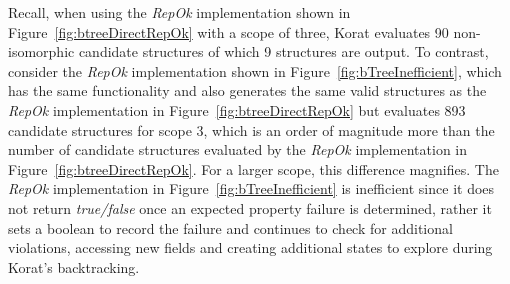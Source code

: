 \para 
Recall, when using the \emph{RepOk} implementation shown in
Figure~\ref{fig:btreeDirectRepOk} with a scope of three, Korat
evaluates 90 non-isomorphic candidate structures of which 9 structures
are output. To contrast, consider the \emph{RepOk} implementation
shown in Figure~\ref{fig:bTreeInefficient}, which has the same
functionality and also generates the same valid structures as the
\emph{RepOk} implementation in Figure~\ref{fig:btreeDirectRepOk} but
evaluates 893 candidate structures for scope 3, which is an order of
magnitude more than the number of candidate structures evaluated by
the \emph{RepOk} implementation in
Figure~\ref{fig:btreeDirectRepOk}. For a larger scope, this difference
magnifies.  The \emph{RepOk} implementation in
Figure~\ref{fig:bTreeInefficient} is inefficient since it does not
return \emph{true/false} once an expected property failure is
determined, rather it sets a boolean to record the failure and
continues to check for additional violations, accessing new fields and
creating additional states to explore during Korat's backtracking.

